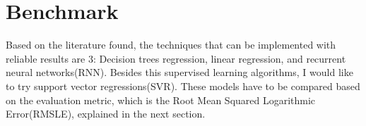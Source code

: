 \section{Benchmark}

Based on the literature found, the techniques that can be implemented with reliable results are 3: Decision trees regression, linear regression, and recurrent neural networks(RNN). Besides this supervised learning algorithms, I would like to try support vector regressions(SVR). These models have to be compared based on the evaluation metric, which is the Root Mean Squared Logarithmic Error(RMSLE), explained in the next section.